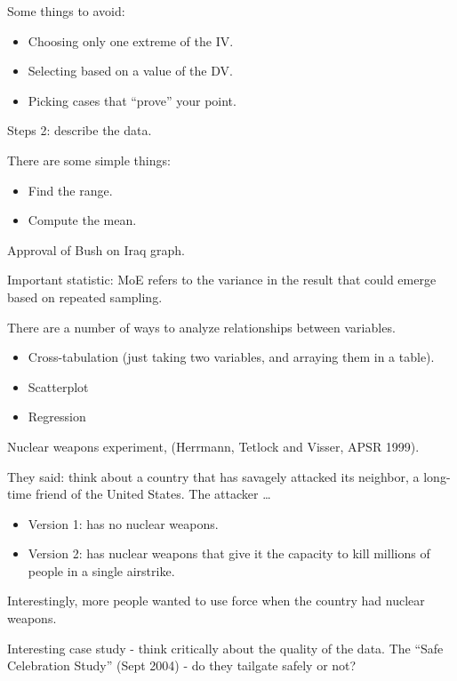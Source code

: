 \documentclass{article}
\begin{document}
Some things to avoid:

\begin{itemize}
  \item Choosing only one extreme of the IV.
  \item Selecting based on a value of the DV.
  \item Picking cases that ``prove'' your point.
\end{itemize}

Steps 2: describe the data.

There are some simple things:

\begin{itemize}
  \item Find the range.
  \item Compute the mean.
\end{itemize}

Approval of Bush on Iraq graph.

Important statistic: MoE refers to the variance in the result that could emerge based on repeated sampling.

There are a number of ways to analyze relationships between variables.

\begin{itemize}
  \item Cross-tabulation (just taking two variables, and arraying them in a table).
  \item Scatterplot
  \item Regression
\end{itemize}

Nuclear weapons experiment, (Herrmann, Tetlock and Visser, APSR 1999).

They said: think about a country that has savagely attacked its neighbor, a long-time friend of the United States.  The attacker \ldots

\begin{itemize}
  \item Version 1: has no nuclear weapons.
  \item Version 2: has nuclear weapons that give it the capacity to kill millions of people in a single airstrike.
\end{itemize}

Interestingly, more people wanted to use force when the country had nuclear weapons.

Interesting case study - think critically about the quality of the data.  The ``Safe Celebration Study'' (Sept 2004) - do they tailgate safely or not?
\end{document}
